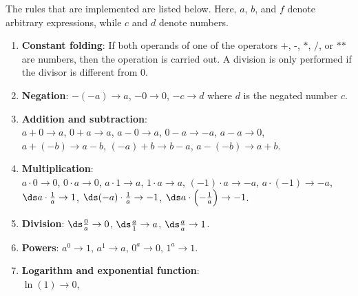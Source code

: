 \begin{enumerate}
      The rules that are implemented are listed below.  Here, $a$, $b$, and $f$ denote arbitrary
      expressions, while $c$ and $d$ denote numbers.
      \begin{enumerate}
      \item \textbf{Constant folding}:  If both operands of one of the operators
            $\texttt{+}$, $\texttt{-}$, $\texttt{*}$, $\texttt{/}$, or $\texttt{**}$ are numbers, then the
            operation is carried out.  A division is only performed if the divisor is different from $0$.
      \item \textbf{Negation}:
            $-(-a) \rightarrow a$, \quad
            $-0 \rightarrow 0$, \quad
            $-c \rightarrow d$ \; where $d$ is the negated number $c$.
      \item \textbf{Addition and subtraction}:
            \\[0.1cm]
            $a + 0 \rightarrow a$, \quad
            $0 + a \rightarrow a$, \quad
            $a - 0 \rightarrow a$, \quad
            $0 - a \rightarrow -a$, \quad
            $a - a \rightarrow 0$,
            \\[0.1cm]
            $a + (-b) \rightarrow a - b$, \quad
            $(-a) + b \rightarrow b - a$, \quad
            $a - (-b) \rightarrow a + b$.
      \item \textbf{Multiplication}:
            \\[0.1cm]
            $a \cdot 0 \rightarrow 0$, \quad
            $0 \cdot a \rightarrow 0$, \quad
            $a \cdot 1 \rightarrow a$, \quad
            $1 \cdot a \rightarrow a$, \quad
            $(-1) \cdot a \rightarrow -a$, \quad
            $a \cdot (-1) \rightarrow -a$,
            \\[0.1cm]
            $\ds a \cdot \frac{1}{a} \rightarrow 1$, \quad
            $\ds (-a) \cdot \frac{1}{a} \rightarrow -1$, \quad
            $\ds a \cdot \Bigl(-\frac{1}{a}\Bigr) \rightarrow -1$.
      \item \textbf{Division}:
            $\ds \frac{0}{a} \rightarrow 0$, \quad
            $\ds \frac{a}{1} \rightarrow a$, \quad
            $\ds \frac{a}{a} \rightarrow 1$.
      \item \textbf{Powers}:
            $a^0 \rightarrow 1$, \quad
            $a^1 \rightarrow a$, \quad
            $0^a \rightarrow 0$, \quad
            $1^a \rightarrow 1$.
      \item \textbf{Logarithm and exponential function}:
            \\[0.1cm]
            $\ln(1) \rightarrow 0$, \quad

\end{enumerate}
\end{enumerate}
